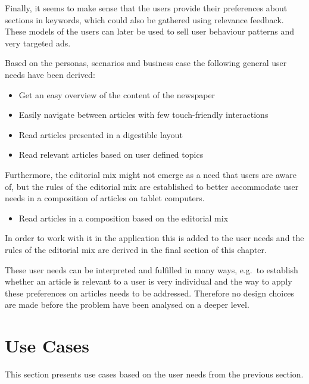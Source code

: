 Finally, it seems to make sense that the users provide their preferences about sections in keywords, which could also be gathered using relevance feedback. These models of the users can later be used to sell user behaviour patterns and very targeted ads.

Based on the personas, scenarios and business case the following general user needs have been derived:
\begin{itemize}\itemdist
	\item Get an easy overview of the content of the newspaper
	\item Easily navigate between articles with few touch-friendly interactions
	\item Read articles presented in a digestible layout
	\item Read relevant articles based on user defined topics
\end{itemize}

Furthermore, the editorial mix might not emerge as a need that users are aware of, but the rules of the editorial mix are established to better accommodate user needs in a composition of articles on tablet computers.
\begin{itemize}\itemdist
	\item Read articles in a composition based on the editorial mix
\end{itemize}
In order to work with it in the application this is added to the user needs and the rules of the editorial mix are derived in the final section of this chapter.

These user needs can be interpreted and fulfilled in many ways, e.g.\ to establish whether an article is relevant to a user is very individual and the way to apply these preferences on articles needs to be addressed. Therefore no design choices are made before the problem have been analysed on a deeper level.

\section{Use Cases}
This section presents use cases based on the user needs from the previous section.

